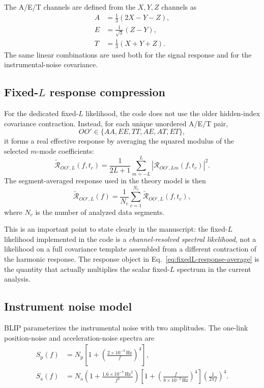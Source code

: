 \documentclass[11pt]{article}
\newcommand{\Rsp}{\widetilde{\mathcal{R}}}
\begin{document}
The A/E/T channels are defined from the $X,Y,Z$ channels as
\begin{align}
  A &= \frac{1}{3}(2X-Y-Z), \\
  E &= \frac{1}{\sqrt{3}}(Z-Y), \\
  T &= \frac{1}{3}(X+Y+Z).
\end{align}
The same linear combinations are used both for the signal response and for the instrumental-noise covariance.

\subsection{Fixed-$L$ response compression}

For the dedicated fixed-$L$ likelihood, the code does not use the older hidden-index covariance contraction. Instead, for each unique unordered A/E/T pair,
\begin{equation}
  OO' \in \{AA, EE, TT, AE, AT, ET\},
\end{equation}
it forms a real effective response by averaging the squared modulus of the selected $m$-mode coefficients:
\begin{equation}
  \Rsp_{OO',L}(f,t_c)
  =
  \frac{1}{2L+1}
  \sum_{m=-L}^{L}
  \left|
    \mathcal{R}_{OO',Lm}(f,t_c)
  \right|^2.
  \label{eq:fixedL-response-segment}
\end{equation}
The segment-averaged response used in the theory model is then
\begin{equation}
  \Rsp_{OO',L}(f)
  =
  \frac{1}{N_c}
  \sum_{c=1}^{N_c}
  \Rsp_{OO',L}(f,t_c),
  \label{eq:fixedL-response-average}
\end{equation}
where $N_c$ is the number of analyzed data segments.

This is an important point to state clearly in the manuscript: the fixed-$L$ likelihood implemented in the code is a \emph{channel-resolved spectral likelihood}, not a likelihood on a full covariance template assembled from a different contraction of the harmonic response. The response object in Eq.~\eqref{eq:fixedL-response-average} is the quantity that actually multiplies the scalar fixed-$L$ spectrum in the current analysis.

\subsection{Instrument noise model}

BLIP parameterizes the instrumental noise with two amplitudes. The one-link position-noise and acceleration-noise spectra are
\begin{align}
  S_{\mathrm{p}}(f)
  &=
  N_{\mathrm{p}}
  \left[
    1 + \left(\frac{2 \times 10^{-3}\,\mathrm{Hz}}{f}\right)^4
  \right], \\
  S_{\mathrm{a}}(f)
  &=
  N_{\mathrm{a}}
  \left(
    1 + \frac{1.6 \times 10^{-7}\,\mathrm{Hz}^2}{f^2}
  \right)
  \left[
    1 + \left(\frac{f}{8 \times 10^{-3}\,\mathrm{Hz}}\right)^4
  \right]
  \left(\frac{1}{2\pi f}\right)^4.
  \label{eq:fundamental-noise}
\end{align}
\end{document}
